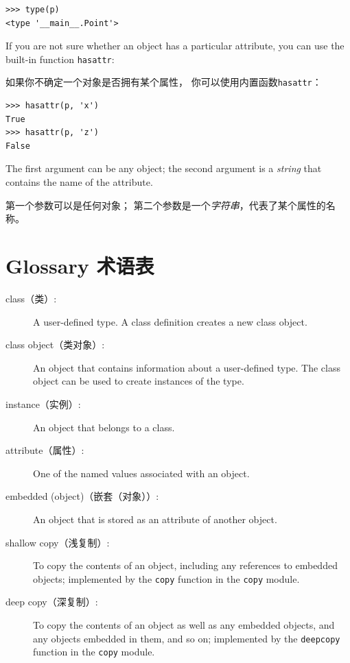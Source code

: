 \documentclass[10pt]{book}
\begin{document}
\begin{CJK}{UTF8}{gbsn}
\begin{verbatim}
>>> type(p)
<type '__main__.Point'>
\end{verbatim}
%
If you are not sure whether an object has a particular attribute,
you can use the built-in function {\tt hasattr}:

如果你不确定一个对象是否拥有某个属性，
你可以使用内置函数{\tt hasattr}：

\begin{verbatim}
>>> hasattr(p, 'x')
True
>>> hasattr(p, 'z')
False
\end{verbatim}
%
The first argument can be any object; the second argument is a {\em
string} that contains the name of the attribute.

第一个参数可以是任何对象；
第二个参数是一个{\em 字符串}，代表了某个属性的名称。

\section{Glossary 术语表}

\begin{description}

\item[class（类）:] A user-defined type.  A class definition creates a new
class object.

\item[class object（类对象）:] An object that contains information about a
user-defined type.  The class object can be used to create instances
of the type.

\item[instance（实例）:] An object that belongs to a class.

\item[attribute（属性）:] One of the named values associated with an object.

\item[embedded (object)（嵌套（对象））:] An object that is stored as an attribute
of another object.

\item[shallow copy（浅复制）:] To copy the contents of an object, including
any references to embedded objects;
implemented by the {\tt copy} function in the {\tt copy} module.

\item[deep copy（深复制）:] To copy the contents of an object as well as any
embedded objects, and any objects embedded in them, and so on;
implemented by the {\tt deepcopy} function in the {\tt copy} module.


\end{description}
\end{CJK}
\end{document}
